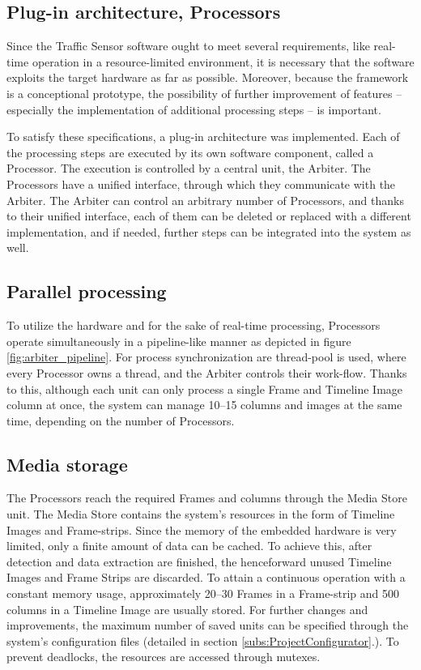 \subsection{Plug-in architecture, Processors}
Since the Traffic Sensor software ought to meet several requirements, like real-time operation in a resource-limited environment, it is necessary that the software exploits the target hardware as far as possible.
Moreover, because the framework is a conceptional prototype, the possibility of further improvement of features -- especially the implementation of additional processing steps -- is important.

To satisfy these specifications, a plug-in architecture was implemented.
Each of the processing steps are executed by its own software component, called a Processor.
The execution is controlled by a central unit, the Arbiter.
The Processors have a unified interface, through which they communicate with the Arbiter.
The Arbiter can control an arbitrary number of Processors, and thanks to their unified interface, each of them can be deleted or replaced with a different implementation, and if needed, further steps can be integrated into the system as well.

\subsection{Parallel processing}
To utilize the hardware and for the sake of real-time processing, Processors operate simultaneously in a pipeline-like manner as depicted in figure \ref{fig:arbiter_pipeline}.
For process synchronization are thread-pool is used, where every Processor owns a thread, and the Arbiter controls their work-flow.
Thanks to this, although each unit can only process a single Frame and Timeline Image column at once, the system can manage 10--15 columns and images at the same time, depending on the number of Processors.

\subsection{Media storage}
The Processors reach the required Frames and columns through the Media Store unit.
The Media Store contains the system's resources in the form of Timeline Images and Frame-strips.
Since the memory of the embedded hardware is very limited, only a finite amount of data can be cached.
To achieve this, after detection and data extraction are finished, the henceforward unused Timeline Images and Frame Strips are discarded.
To attain a continuous operation with a constant memory usage, approximately 20--30 Frames in a Frame-strip and 500 columns in a Timeline Image are usually stored.
For further changes and improvements, the maximum number of saved units can be specified through the system's configuration files (detailed in section \ref{subs:ProjectConfigurator}.).
To prevent deadlocks, the resources are accessed through mutexes.

